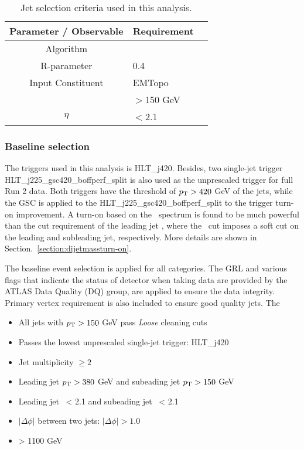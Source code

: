 \begin{table}[ht]
	\centering
		\begin{tabular}{clc}
			\hline
			Parameter / Observable & Requirement \\
			\hline
			Algorithm & \akt \\
			R-parameter & 0.4 \\
			Input Constituent & EMTopo\\
			\pt & $>$150 GeV \\
			\textbar$\eta$\textbar & $<$2.1 \\
			\hline
	\end{tabular}
\caption{Jet selection criteria used in this analysis.}
\label{tab:jetCalibration}
\end{table}


\subsubsection{Baseline selection}
\label{sec:base_selection}


The triggers used in this analysis is HLT\_j420. Besides, two single-jet trigger HLT\_j225\_gsc420\_boffperf\_split is also used as the unprescaled trigger for full Run 2 data. Both triggers have the threshold of $p_{\mathrm{T}} > 420$ GeV of the jets, while the GSC is applied to the HLT\_j225\_gsc420\_boffperf\_split to the trigger turn-on improvement. A turn-on based on the \mjj~spectrum is found to be much powerful than the cut requirement of the leading jet \pt, where the \mjj~cut imposes a soft cut on the leading and subleading jet, respectively. More details are shown in Section.~\ref{section:dijetmassturn-on}. 




The baseline event selection is applied for all categories. The GRL and various flags that indicate the status of detector when taking data are provided by the ATLAS Data Quality (DQ) group, are applied to ensure the data integrity. Primary vertex requirement is also included to ensure good quality jets. The  


\begin{itemize}
\item All jets with $p_{\mathrm{T}} > 150$ GeV pass \textit{Loose} cleaning cuts
\item Passes the lowest unprescaled single-jet trigger: HLT\_j420
\item Jet multiplicity $\ge 2$
\item Leading jet $p_{\mathrm{T}} > 380$ GeV and subeading jet $p_{\mathrm{T}} > 150$ GeV
\item Leading jet \abseta~< 2.1 and subeading jet \abseta~< 2.1 
\item $|\Delta\phi|$ between two jets: $|\Delta\phi| > 1.0$
\item \mjj > 1100 GeV
\end{itemize}

